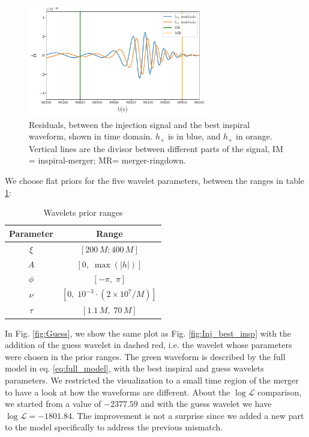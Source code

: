 \begin{figure}[h!]
    \centering
    \includegraphics[width=0.7\textwidth]{Images/Residuals.pdf}
    \caption{Residuals, between the injection signal and the best inspiral waveform, shown in time domain. $h_{+}$ is in blue, and  $h_{\times}$ in orange. Vertical lines are the divisor between different parts of the signal, IM = inspiral-merger; MR= merger-ringdown. }
    \label{fig:Residuals}
\end{figure}

We choose flat priors for the five wavelet parameters, between the ranges in table \ref{tab:guess_ranges}: 

\begin{table}[h]
\centering
\begin{tabular}{cc}
\hline
\textbf{Parameter} & \textbf{Range} \\
\hline
$\xi$ & $[ 200\,M; 400\,M]$ \\
$A$ & $[0,\; \max(|h|)] $ \\
$\phi$ & $[-\pi,\; \pi]$  \\
$\nu$ & $[0,\; 10^{-3} \cdot (2\times10^7 / M)]$ \\
$\tau$ & $[1.1\,M,\; 70\,M]$ \\
\hline
\end{tabular}
\caption{Wavelets prior ranges}
\label{tab:guess_ranges}
\end{table}

In Fig. \ref{fig:Guess}, we show the same plot as Fig. \ref{fig:Inj_best_insp} with the addition of the guess wavelet in dashed red, i.e. the wavelet whose parameters were chosen in the prior ranges. The green waveform is described by the full model in eq. \ref{eq:full_model}, with the best inspiral and guess wavelets parameters. We restricted the visualization to a small time region of the merger to have a look at how the waveforms are different. About the $\log \mathcal{L}$ comparison, we started from a value of $ -2377.59 $ and with the guess wavelet we have $\log \mathcal{L} = -1801.84 $. The improvement is not a surprise since we added a new part to the model specifically to address the previous mismatch.


